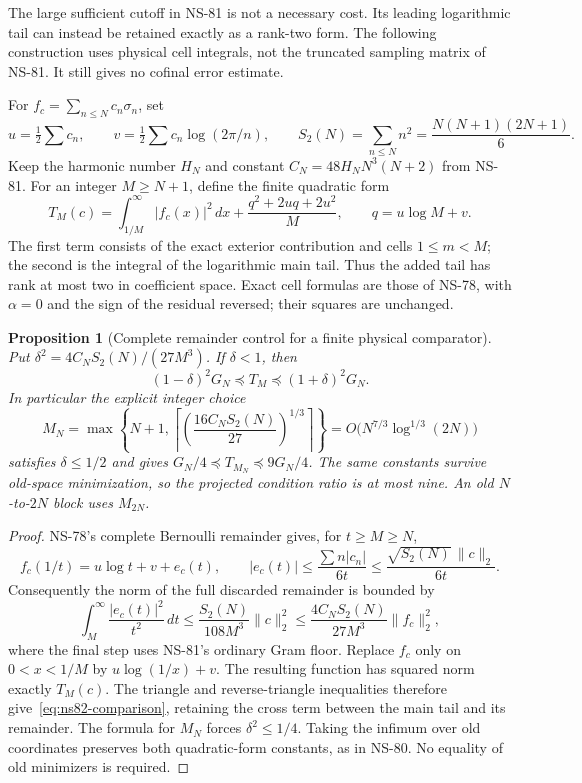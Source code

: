 \documentclass[11pt]{article}
\newtheorem{proposition}[theorem]{Proposition}
\theoremstyle{remark}
\begin{document}
The large sufficient cutoff in NS-81 is not a necessary cost. Its leading
logarithmic tail can instead be retained exactly as a rank-two form. The
following construction uses physical cell integrals, not the truncated
sampling matrix of NS-81. It still gives no cofinal error estimate.

For $f_c=\sum_{n\leq N}c_n\sigma_n$, set
\[
 u=\tfrac12\sum c_n,\qquad
 v=\tfrac12\sum c_n\log(2\pi/n),\qquad
 S_2(N)=\sum_{n\leq N}n^2=\frac{N(N+1)(2N+1)}6.
\]
Keep the harmonic number $H_N$ and constant $C_N=48H_NN^3(N+2)$
from NS-81. For an integer $M\geq N+1$, define the finite quadratic form
\begin{equation}
 T_M(c)=\int_{1/M}^{\infty}|f_c(x)|^2\,dx
       +\frac{q^2+2uq+2u^2}{M},\qquad q=u\log M+v.
 \label{eq:ns82-comparator}
\end{equation}
The first term consists of the exact exterior contribution and cells
$1\leq m<M$; the second is the integral of the logarithmic main tail.
Thus the added tail has rank at most two in coefficient space. Exact
cell formulas are those of NS-78, with $\alpha=0$ and the sign of the
residual reversed; their squares are unchanged.

\begin{proposition}[Complete remainder control for a finite physical comparator]
\label{prop:ns82-tail-compression}
Put $\delta^2=4C_NS_2(N)/(27M^3)$. If $\delta<1$, then
\begin{equation}
 (1-\delta)^2G_N\preceq T_M\preceq(1+\delta)^2G_N.
 \label{eq:ns82-comparison}
\end{equation}
In particular the explicit integer choice
\[
 M_N=\max\left\{N+1,
 \left\lceil\left(\frac{16C_NS_2(N)}{27}\right)^{1/3}\right\rceil\right\}
 =O\bigl(N^{7/3}\log^{1/3}(2N)\bigr)
\]
satisfies $\delta\leq1/2$ and gives
$G_N/4\preceq T_{M_N}\preceq9G_N/4$.
The same constants survive old-space minimization, so the projected
condition ratio is at most nine. An old $N$-to-$2N$ block uses $M_{2N}$.
\end{proposition}
\begin{proof}
NS-78's complete Bernoulli remainder gives, for $t\geq M\geq N$,
\[
 f_c(1/t)=u\log t+v+e_c(t),\qquad
 |e_c(t)|\leq\frac{\sum n|c_n|}{6t}
            \leq\frac{\sqrt{S_2(N)}\,\|c\|_2}{6t}.
\]
Consequently the norm of the full discarded remainder is bounded by
\[
 \int_M^\infty\frac{|e_c(t)|^2}{t^2}\,dt
 \leq\frac{S_2(N)}{108M^3}\|c\|_2^2
 \leq\frac{4C_NS_2(N)}{27M^3}\|f_c\|_2^2,
\]
where the final step uses NS-81's ordinary Gram floor. Replace $f_c$
only on $0<x<1/M$ by $u\log(1/x)+v$. The resulting function has squared
norm exactly $T_M(c)$. The triangle and reverse-triangle inequalities
therefore give~\eqref{eq:ns82-comparison}, retaining the cross term
between the main tail and its remainder. The formula for $M_N$ forces
$\delta^2\leq1/4$. Taking the infimum over old coordinates preserves
both quadratic-form constants, as in NS-80. No equality of old
minimizers is required.
\end{proof}
\end{document}
